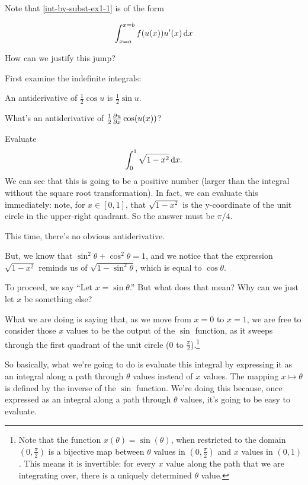 \begin{example}
  Note that \eqref{int-by-subst-ex1-1} is of the form

  \begin{align*}
    \int_{x=a}^{x=b} f(u(x))u'(x) \dx
  \end{align*}

  How can we justify this jump?

  First examine the indefinite integrals:

  An antiderivative of $\frac{1}{2}\cos u$ is $\frac{1}{2}\sin u$.

  What's an antiderivative of $\frac{1}{2} \frac{\partial u}{\partial x} \cos(u(x))$?
\end{example}



\begin{example}
  Evaluate
  \begin{align*}
     \int _{0}^{1} \sqrt {1-x^{2}} \dx.
  \end{align*}
  We can see that this is going to be a positive number (larger than the integral without the square
  root transformation). In fact, we can evaluate this immediately: note, for $x \in [0, 1]$, that
  $\sqrt{1 - x^2}$ is the y-coordinate of the unit circle in the upper-right quadrant. So the answer
  must be $\pi/4$.

  This time, there's no obvious antiderivative.

  But, we know that $\sin^2 \theta + \cos^2 \theta = 1$, and we notice that the expression
  $\sqrt{1 - x^2}$ reminds us of $\sqrt{1 - \sin^2 \theta}$, which is equal to $\cos \theta$.

  To proceed, we say ``Let $x = \sin \theta$.'' But what does that mean? Why can we just let $x$ be something else?

  What we are doing is saying that, as we move from $x=0$ to $x = 1$, we are free to consider those
  $x$ values to be the output of the $\sin$ function, as it sweeps through the first quadrant of the
  unit circle ($0$ to $\frac{\pi}{2}$).\footnote{Note that the function $x(\theta) = \sin(\theta)$, when restricted to the domain
    $(0, \frac{\pi}{2})$ is a bijective map between $\theta$ values in $(0, \frac{\pi}{2})$ and $x$ values in
    $(0, 1)$. This means it is invertible: for every $x$ value along the path that we are integrating
    over, there is a uniquely determined $\theta$ value.}

  So basically, what we're going to do is evaluate this integral by expressing it as an integral along
  a path through $\theta$ values instead of $x$ values. The mapping $x \mapsto \theta$ is defined by the inverse of the
  $\sin$ function. We're doing this because, once expressed as an integral along a path through
  $\theta$ values, it's going to be easy to evaluate.


\end{example}
